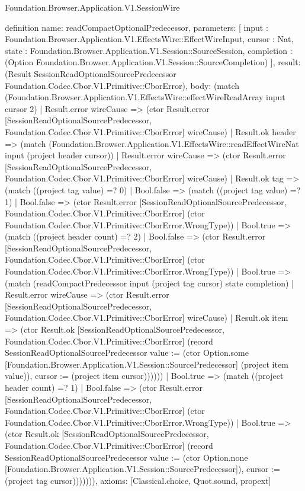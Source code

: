 \begin{lexlean}{Foundation.Browser.Application.V1.SessionWire}
\begin{semanticmodule}
definition{
  name: readCompactOptionalPredecessor,
  parameters: [
    input : Foundation.Browser.Application.V1.EffectsWire::EffectWireInput,
    cursor : Nat,
    state : Foundation.Browser.Application.V1.Session::SourceSession,
    completion : (Option Foundation.Browser.Application.V1.Session::SourceCompletion)
  ],
  result: (Result SessionReadOptionalSourcePredecessor Foundation.Codec.Cbor.V1.Primitive::CborError),
  body: (match (Foundation.Browser.Application.V1.EffectsWire::effectWireReadArray input cursor 2)
    | Result.error wireCause => (ctor Result.error [SessionReadOptionalSourcePredecessor, Foundation.Codec.Cbor.V1.Primitive::CborError] wireCause)
    | Result.ok header => (match (Foundation.Browser.Application.V1.EffectsWire::readEffectWireNat input (project header cursor))
      | Result.error wireCause => (ctor Result.error [SessionReadOptionalSourcePredecessor, Foundation.Codec.Cbor.V1.Primitive::CborError] wireCause)
      | Result.ok tag => (match ((project tag value) =? 0)
        | Bool.false => (match ((project tag value) =? 1)
          | Bool.false => (ctor Result.error [SessionReadOptionalSourcePredecessor, Foundation.Codec.Cbor.V1.Primitive::CborError] (ctor Foundation.Codec.Cbor.V1.Primitive::CborError.WrongType))
          | Bool.true => (match ((project header count) =? 2)
            | Bool.false => (ctor Result.error [SessionReadOptionalSourcePredecessor, Foundation.Codec.Cbor.V1.Primitive::CborError] (ctor Foundation.Codec.Cbor.V1.Primitive::CborError.WrongType))
            | Bool.true => (match (readCompactPredecessor input (project tag cursor) state completion)
              | Result.error wireCause => (ctor Result.error [SessionReadOptionalSourcePredecessor, Foundation.Codec.Cbor.V1.Primitive::CborError] wireCause)
              | Result.ok item => (ctor Result.ok [SessionReadOptionalSourcePredecessor, Foundation.Codec.Cbor.V1.Primitive::CborError] (record SessionReadOptionalSourcePredecessor {value := (ctor Option.some [Foundation.Browser.Application.V1.Session::SourcePredecessor] (project item value)), cursor := (project item cursor)})))))
        | Bool.true => (match ((project header count) =? 1)
          | Bool.false => (ctor Result.error [SessionReadOptionalSourcePredecessor, Foundation.Codec.Cbor.V1.Primitive::CborError] (ctor Foundation.Codec.Cbor.V1.Primitive::CborError.WrongType))
          | Bool.true => (ctor Result.ok [SessionReadOptionalSourcePredecessor, Foundation.Codec.Cbor.V1.Primitive::CborError] (record SessionReadOptionalSourcePredecessor {value := (ctor Option.none [Foundation.Browser.Application.V1.Session::SourcePredecessor]), cursor := (project tag cursor)})))))),
  axioms: [Classical.choice, Quot.sound, propext]
}


\end{semanticmodule}
\end{lexlean}
